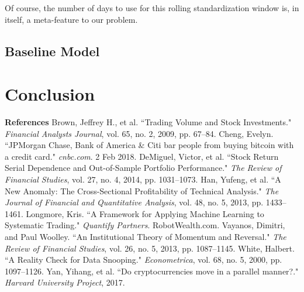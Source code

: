 \documentclass[12pt,twoside]{article}
\begin{document}
Of course, the number of days to use for this rolling standardization window is, in itself, a meta-feature to our problem.

\subsection{Baseline Model}



\section{Conclusion}



\newpage
{\large \textbf{References}}
\bigbreak
Brown, Jeffrey H., et al. ``Trading Volume and Stock Investments." \textit{Financial Analysts Journal}, vol. 65, no. 2, 2009, pp. 67–84.
\bigbreak
Cheng, Evelyn. ``JPMorgan Chase, Bank of America \& Citi bar people from buying bitcoin with a credit card." \textit{cnbc.com}. 2 Feb 2018.
\bigbreak
DeMiguel, Victor, et al. ``Stock Return Serial Dependence and Out-of-Sample Portfolio Performance." \textit{The Review of Financial Studies}, vol. 27, no. 4, 2014, pp. 1031–1073.
\bigbreak
Han, Yufeng, et al. ``A New Anomaly: The Cross-Sectional Profitability of Technical Analysis." \textit{The Journal of Financial and Quantitative Analysis}, vol. 48, no. 5, 2013, pp. 1433–1461.
\bigbreak
Longmore, Kris. ``A Framework for Applying Machine Learning to Systematic Trading." \textit{Quantify Partners}. RobotWealth.com.
\bigbreak
Vayanos, Dimitri, and Paul Woolley. ``An Institutional Theory of Momentum and Reversal." \textit{The Review of Financial Studies}, vol. 26, no. 5, 2013, pp. 1087–1145.
\bigbreak
White, Halbert. ``A Reality Check for Data Snooping." \textit{Econometrica}, vol. 68, no. 5, 2000, pp. 1097–1126.
\bigbreak
Yan, Yihang, et al. ``Do cryptocurrencies move in a parallel manner?." \textit{Harvard University Project}, 2017.
\bigbreak
\end{document}
